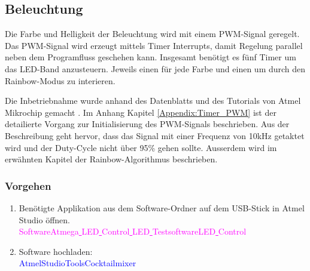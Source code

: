 \subsection{Beleuchtung}
\label{subsec:Inbetriebnahme_Beleuchtung}

Die Farbe und Helligkeit der Beleuchtung wird mit einem PWM-Signal geregelt. Das PWM-Signal wird erzeugt mittels Timer Interrupts, damit Regelung parallel neben dem Programfluss geschehen kann. Insgesamt benötigt es fünf Timer um das LED-Band anzusteuern. Jeweils einen für jede Farbe und einen um durch den Rainbow-Modus zu interieren.

Die Inbetriebnahme wurde anhand des Datenblatts und des Tutorials von Atmel Mikrochip gemacht \cite{mikrochip_makes_getting_2015}\cite{mikrochip_makes_getting_2015-1}\cite{mikrochip_makes_getting_2015-2}. Im Anhang Kapitel \ref{Appendix:Timer_PWM} ist der detailierte Vorgang zur Initialisierung des PWM-Signals beschrieben. Aus der Beschreibung geht hervor, dass das Signal mit einer Frequenz von 10kHz getaktet wird und der Duty-Cycle nicht über 95\% gehen sollte. Ausserdem wird im erwähnten Kapitel der Rainbow-Algorithmus beschrieben.



\subsubsection{Vorgehen}

\begin{enumerate}
\item Benötigte Applikation aus dem Software-Ordner auf dem USB-Stick in Atmel Studio öffnen.\\
\textcolor{magenta}{Software\textrightarrow Atmega\underline{ }LED\underline{ }Control\underline{ }LED\underline{ }Testsoftware\textrightarrow LED\underline{ }Control}\\

\item Software hochladen:\\
\textcolor{blue}{AtmelStudio\textrightarrow Tools\textrightarrow Cocktailmixer}\\

\end{enumerate}